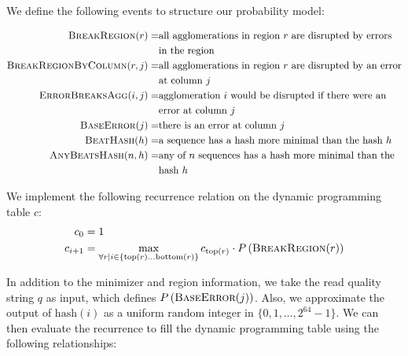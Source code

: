 \documentclass[11pt]{ucscthesis}
\newcommand{\rtop}[1]{\mathrm{top}(#1)}
\newcommand{\rbottom}[1]{\mathrm{bottom}(#1)}
\newcommand{\agghash}[1]{\mathrm{hash}(#1)}
\begin{document}
\newcommand{\BreakRegion}[1]{\textsc{BreakRegion}(#1)}
\newcommand{\BreakRegionByColumn}[2]{\textsc{BreakRegionByColumn}(#1, #2)}
\newcommand{\ErrorBreaksAgg}[2]{\textsc{ErrorBreaksAgg}(#1, #2)}
\newcommand{\BaseError}[1]{\textsc{BaseError}(#1)}
\newcommand{\BeatHash}[1]{\textsc{BeatHash}(#1)}
\newcommand{\AnyBeatsHash}[2]{\textsc{AnyBeatsHash}(#1, #2)}

We define the following events to structure our probability model:

\begin{align*}
    \BreakRegion{r} = &\text{all agglomerations in region } r \text{ are disrupted by errors} \\
                    & \text{in the region} \nonumber \\
    \BreakRegionByColumn{r}{j} = & \text{all agglomerations in region } r \text{ are disrupted by an error}\\
                                & \text{at column } j \nonumber\\
    \ErrorBreaksAgg{i}{j} = & \text{agglomeration } i \text{ would be disrupted if there were an} \\
                            & \text{error at column } j \nonumber \\
    \BaseError{j} =& \text{there is an error at column } j \nonumber \\
    \BeatHash{h} =& \text{a sequence has a hash more minimal than the hash } h \nonumber \\
    \AnyBeatsHash{n}{h} =& \text{any of } n \text{ sequences has a hash more minimal than the} \\
                          & \text{hash } h \nonumber
\end{align*}

\begin{samepage}
We implement the following recurrence relation on the dynamic programming table $c$:
\nopagebreak
\begin{align*}
    c_0 &= 1 \nonumber \\
    c_{i + 1} &= \max_{\forall r \mid i \in \left\{\rtop{r} \ldots \rbottom{r}\right\}} c_{\rtop{r}} \cdot \Prob{\BreakRegion{r}} \nonumber
\end{align*}
\end{samepage}

\newcommand{\candidates}[2]{\mathrm{candidates}({#1},\ {#2})}

In addition to the minimizer and region information, we take the read quality string $q$ as input, which defines $\Prob{\BaseError{j}}$. Also, we approximate the output of $\agghash{i}$ as a uniform random integer in $\{0,1,\ldots,2^{64}-1\}$. We can then evaluate the recurrence to fill the dynamic programming table using the following relationships:
\end{document}

